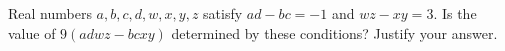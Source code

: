 Real numbers $a,b,c,d,w,x,y,z$ satisfy $ad-bc=-1$ and $wz-xy=3$. Is the value of $9(adwz-bcxy)$ determined by these conditions? Justify your answer.
